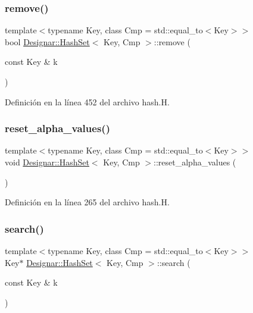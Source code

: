 \subsubsection{\texorpdfstring{remove()}{remove()}}
{\footnotesize\ttfamily template$<$typename Key, class Cmp = std\+::equal\+\_\+to$<$\+Key$>$$>$ \\
bool \hyperlink{class_designar_1_1_hash_set}{Designar\+::\+Hash\+Set}$<$ Key, Cmp $>$\+::remove (\begin{DoxyParamCaption}\item[{const Key \&}]{k }\end{DoxyParamCaption})\hspace{0.3cm}{\ttfamily [inline]}}



Definición en la línea 452 del archivo hash.\+H.

\mbox{\label{class_designar_1_1_hash_set_a40fccab92f794f86e2d2fe602f8ffb1f}} 
\subsubsection{\texorpdfstring{reset\+\_\+alpha\+\_\+values()}{reset\_alpha\_values()}}
{\footnotesize\ttfamily template$<$typename Key, class Cmp = std\+::equal\+\_\+to$<$\+Key$>$$>$ \\
void \hyperlink{class_designar_1_1_hash_set}{Designar\+::\+Hash\+Set}$<$ Key, Cmp $>$\+::reset\+\_\+alpha\+\_\+values (\begin{DoxyParamCaption}{ }\end{DoxyParamCaption})\hspace{0.3cm}{\ttfamily [inline]}}



Definición en la línea 265 del archivo hash.\+H.

\mbox{\label{class_designar_1_1_hash_set_a4c374f62530fe151b47e42ed05ddc7fb}} 
\subsubsection{\texorpdfstring{search()}{search()}\hspace{0.1cm}{\footnotesize\ttfamily [1/2]}}
{\footnotesize\ttfamily template$<$typename Key, class Cmp = std\+::equal\+\_\+to$<$\+Key$>$$>$ \\
Key$\ast$ \hyperlink{class_designar_1_1_hash_set}{Designar\+::\+Hash\+Set}$<$ Key, Cmp $>$\+::search (\begin{DoxyParamCaption}\item[{const Key \&}]{k }\end{DoxyParamCaption})\hspace{0.3cm}{\ttfamily [inline]}}



